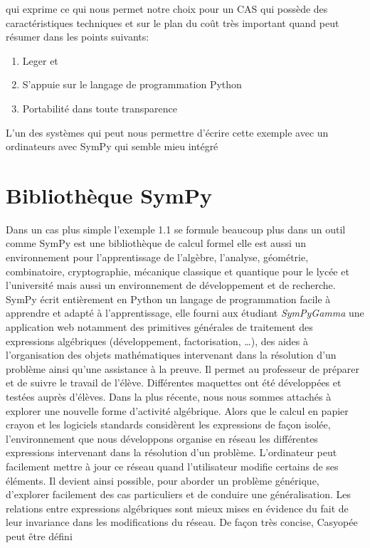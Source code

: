 \documentclass[11pt,fleqn]{book} %
\begin{document}
qui exprime ce qui nous permet notre choix pour un CAS qui possède des caractéristiques techniques et sur le plan du coût très important quand peut résumer dans les points suivants:
\begin{enumerate}
	\item Leger et 
	\item S’appuie sur le langage de programmation Python
	\item Portabilité dans toute transparence
\end{enumerate}

L'un des systèmes qui peut nous permettre d'écrire cette exemple avec un ordinateurs avec SymPy qui semble mieu intégré

\section{Bibliothèque SymPy}

Dans un cas plus simple l'exemple 1.1 se formule beaucoup plus dans un outil comme SymPy est une bibliothèque de calcul formel elle est aussi un environnement pour 
l’apprentissage de l’algèbre, l’analyse, géométrie, combinatoire, cryptographie, mécanique 
classique et quantique pour le lycée et l’université mais aussi un environnement de 
développement et de recherche. SymPy  écrit entièrement en Python un langage de 
programmation facile à apprendre et adapté à l’apprentissage,  elle fourni aux étudiant 
\textit{SymPyGamma} une application web   notamment des primitives générales de traitement des expressions algébriques (développement, factorisation, …), des aides à l’organisation des objets mathématiques intervenant dans la résolution d’un problème ainsi qu’une assistance à la preuve. Il permet au professeur de préparer et de suivre le travail de l’élève. Différentes maquettes ont été développées et testées auprès d’élèves. Dans la plus récente, nous nous sommes attachés à explorer une nouvelle forme d’activité algébrique. Alors que le calcul en papier crayon et les logiciels standards considèrent
 les expressions de façon isolée, l’environnement que nous développons organise en réseau les différentes expressions intervenant dans la résolution d’un problème. L’ordinateur peut facilement mettre à jour ce réseau quand l’utilisateur modifie certains de ses éléments. Il devient ainsi possible, pour aborder un problème générique, d’explorer facilement des cas particuliers et de conduire une généralisation. Les relations entre expressions algébriques sont mieux mises en évidence du fait de leur invariance dans les modifications du réseau. De façon très concise, Casyopée peut être défini
\end{document}
